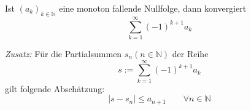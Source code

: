 Ist $(a_k)_{k \in \mathbb{N}}$ eine monoton fallende Nullfolge, dann konvergiert
$$\sum_{k=1}^\infty (-1)^{k+1} a_k$$

\textit{Zusatz:} Für die Partialsummen $s_n (n \in \mathbb{N})$ der Reihe
$$s := \sum_{k=1}^\infty (-1)^{k+1} a_k$$
gilt folgende Abschätzung:
$$|s - s_n| \leq a_{n+1} \qquad \forall n \in \mathbb{N}$$